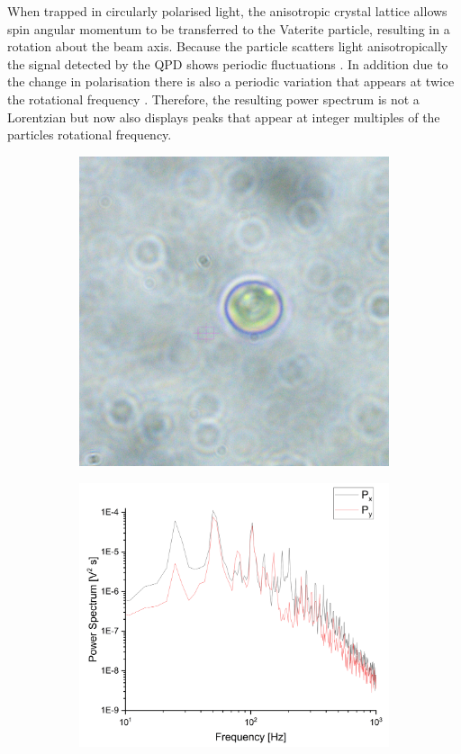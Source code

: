 When trapped in circularly polarised light, the anisotropic 
crystal lattice allows spin angular momentum to be transferred 
to the Vaterite particle, resulting in a rotation about the 
beam axis. Because the particle scatters light anisotropically 
the signal detected by the QPD shows periodic fluctuations 
\cite{Yogesha2012}. In addition due to the change in polarisation 
there is also a periodic variation that appears at twice the 
rotational frequency \cite{Monteiro2018}. Therefore, the resulting 
power spectrum is not a Lorentzian but now also displays peaks 
that appear at integer multiples of the particles rotational 
frequency. 
\begin{figure}[h!]
	\centering
	\begin{subfigure}{0.4\linewidth}
		\includegraphics[width=\linewidth]{vaterite_sample.jpg}
		\subcaption{}
	\end{subfigure}
	\begin{subfigure}{0.55\linewidth}
		\includegraphics[width=\linewidth]{rotating_psd.png}

\end{subfigure}
\end{figure}
